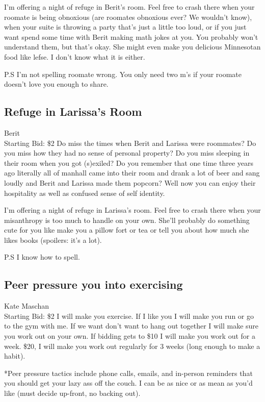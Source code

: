 \documentclass[11pt]{article}
\begin{document}
I'm offering a night of refuge in Berit's room. Feel free to crash there when your roomate is being obnoxious (are roomates obnoxious ever? We wouldn't know), when your suite is throwing a party that's just a little too loud, or if you just want spend some time with Berit making math jokes at you. You probably won't understand them, but that's okay. She might even make you delicious Minnesotan food like lefse. I don't know what it is either. 

P.S I'm not spelling roomate wrong. You only need two m's if your roomate doesn't love you enough to share.
\subsection{Refuge in Larissa's Room}
Berit 
\\
Starting Bid: \$2
\newline
Do miss the times when Berit and Larissa were roommates? Do you miss how they had no sense of personal property? Do you miss sleeping in their room when you got (s)exiled? Do you remember that one time three years ago literally all of manhall came into their room and drank a lot of beer and sang loudly and Berit and Larissa made them popcorn? 
Well now you can enjoy their hospitality as well as confused sense of self identity. 

I'm offering a night of refuge in Larissa's room. Feel free to crash there when your misanthropy is too much to handle on your own. She'll probably do something cute for you like make you a pillow fort or tea or tell you about how much she likes books (spoilers: it's a lot).

P.S I know how to spell.
\subsection{Peer pressure you into exercising}
Kate Maschan
\\
Starting Bid: \$2
\newline
I will make you exercise. If I like you I will make you run or go to the gym with me. If we want don't want to hang out together I will make sure you work out on your own.
If bidding gets to \$10 I will make you work out for a week.
\$20, I will make you work out regularly for 3 weeks (long enough to make a habit).

*Peer pressure tactics include phone calls, emails, and in-person reminders that you should get your lazy ass off the couch. I can be as nice or as mean as you'd like (must decide up-front, no backing out).
\end{document}
